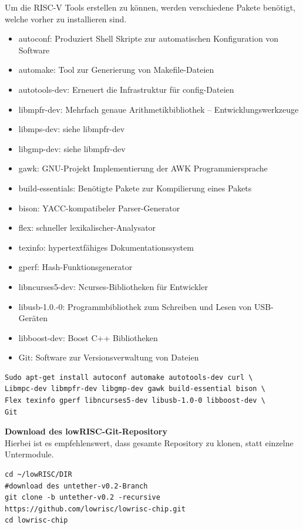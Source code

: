 Um die RISC-V Tools erstellen zu können, werden verschiedene Pakete benötigt, welche vorher zu installieren sind.
\begin{itemize}
  \item autoconf: Produziert Shell Skripte zur automatischen Konfiguration von Software
  \item automake: Tool zur Generierung von Makefile-Dateien
  \item autotools-dev: Erneuert die Infrastruktur für config-Dateien
  \item libmpfr-dev: Mehrfach genaue Arithmetikbibliothek – Entwicklungswerkzeuge
  \item libmps-dev: siehe libmpfr-dev
  \item libgmp-dev: siehe libmpfr-dev
  \item gawk: GNU-Projekt Implementierung der AWK Programmiersprache
  \item build-essentials: Benötigte Pakete zur Kompilierung eines Pakets
  \item bison: YACC-kompatibeler Parser-Generator
  \item flex: schneller lexikalischer-Analysator
  \item texinfo: hypertextfähiges Dokumentationssystem
  \item gperf: Hash-Funktionsgenerator
  \item libncurses5-dev: Ncurses-Bibliotheken für Entwickler
  \item libusb-1.0.-0: Programmbibliothek zum Schreiben und Lesen von USB-Geräten
  \item libboost-dev: Boost C++ Bibliotheken
  \item Git: Software zur Versionsverwaltung von Dateien
\end{itemize}


\begin{lstlisting}[caption={Installation der benötigten RISC-V-Tools},label={code:riscvtools}]
Sudo apt-get install autoconf automake autotools-dev curl \
Libmpc-dev libmpfr-dev libgmp-dev gawk build-essential bison \
Flex texinfo gperf libncurses5-dev libusb-1.0-0 libboost-dev \
Git
\end{lstlisting}


\textbf{Download des lowRISC-Git-Repository}\\

Hierbei ist es empfehlenswert, dass gesamte Repository zu klonen, statt einzelne Untermodule.\\

\begin{lstlisting}[caption={Download des Repositories},label={code:riscrepository}]
cd ~/lowRISC/DIR
#download des untether-v0.2-Branch
git clone -b untether-v0.2 -recursive https://github.com/lowrisc/lowrisc-chip.git
cd lowrisc-chip
\end{lstlisting}


